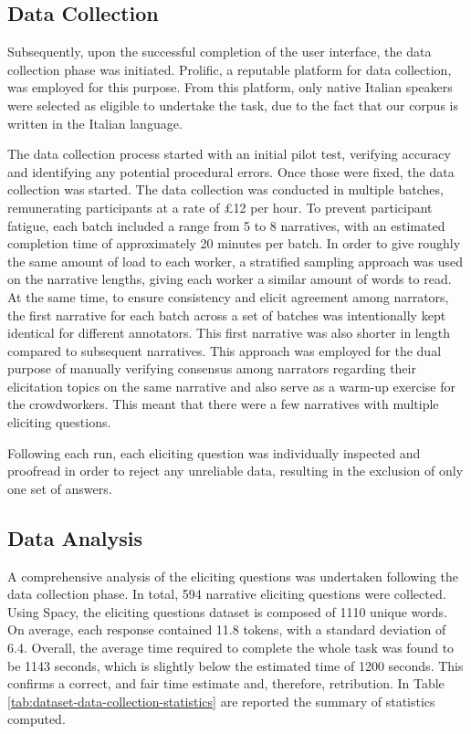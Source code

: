 \subsection{Data Collection}
\label{cha:methodology-data-collection}
Subsequently, upon the successful completion of the user interface, the data collection phase was initiated. Prolific, a reputable platform \cite{prolific} for data collection, was employed for this purpose. From this platform, only native Italian speakers were selected as eligible to undertake the task, due to the fact that our corpus is written in the Italian language.

The data collection process started with an initial pilot test, verifying accuracy and identifying any potential procedural errors. Once those were fixed, the data collection was started. The data collection was conducted in multiple batches, remunerating participants at a rate of £12 per hour. To prevent participant fatigue, each batch included a range from 5 to 8 narratives, with an estimated completion time of approximately 20 minutes per batch. In order to give roughly the same amount of load to each worker, a stratified sampling approach was used on the narrative lengths, giving each worker a similar amount of words to read. At the same time, to ensure consistency and elicit agreement among narrators, the first narrative for each batch across a set of batches was intentionally kept identical for different annotators. This first narrative was also shorter in length compared to subsequent narratives. This approach was employed for the dual purpose of manually verifying consensus among narrators regarding their elicitation topics on the same narrative and also serve as a warm-up exercise for the crowdworkers. This meant that there were a few narratives with multiple eliciting questions.

Following each run, each eliciting question was individually inspected and proofread in order to reject any unreliable data, resulting in the exclusion of only one set of answers.


\subsection{Data Analysis}
\label{cha:methodology-crowdsourcing-data-analysis}


A comprehensive analysis of the eliciting questions was undertaken following the data collection phase. In total, 594 narrative eliciting questions were collected. Using Spacy, the eliciting questions dataset is composed of 1110 unique words. On average, each response contained 11.8 tokens, with a standard deviation of 6.4. Overall, the average time required to complete the whole task was found to be 1143 seconds, which is slightly below the estimated time of 1200 seconds. This confirms a correct, and fair time estimate and, therefore, retribution. In Table \ref{tab:dataset-data-collection-statistics} are reported the summary of statistics computed. 

